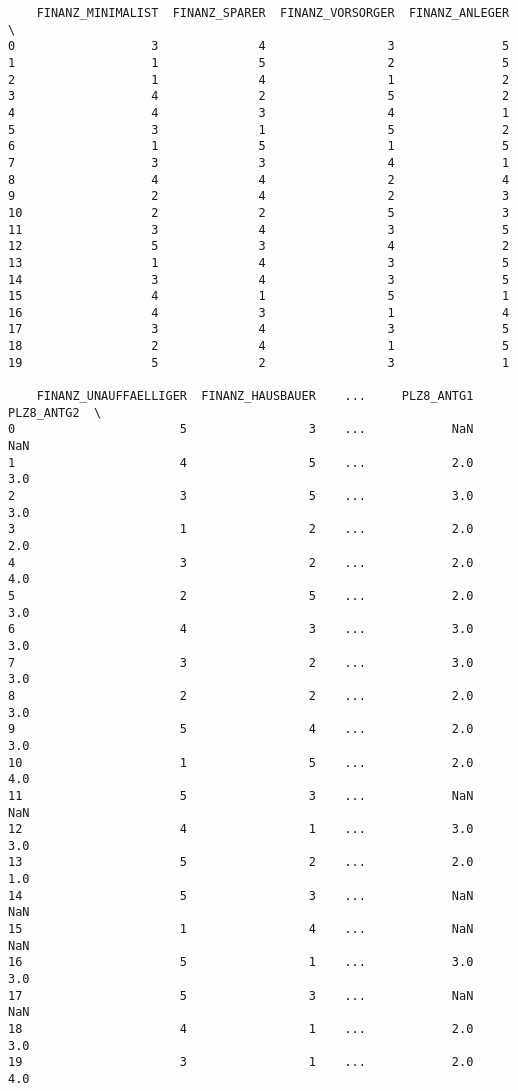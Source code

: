 \documentclass[11pt]{article}
\begin{document}
\begin{verbatim}
    FINANZ_MINIMALIST  FINANZ_SPARER  FINANZ_VORSORGER  FINANZ_ANLEGER  \
0                   3              4                 3               5   
1                   1              5                 2               5   
2                   1              4                 1               2   
3                   4              2                 5               2   
4                   4              3                 4               1   
5                   3              1                 5               2   
6                   1              5                 1               5   
7                   3              3                 4               1   
8                   4              4                 2               4   
9                   2              4                 2               3   
10                  2              2                 5               3   
11                  3              4                 3               5   
12                  5              3                 4               2   
13                  1              4                 3               5   
14                  3              4                 3               5   
15                  4              1                 5               1   
16                  4              3                 1               4   
17                  3              4                 3               5   
18                  2              4                 1               5   
19                  5              2                 3               1   

    FINANZ_UNAUFFAELLIGER  FINANZ_HAUSBAUER    ...     PLZ8_ANTG1  PLZ8_ANTG2  \
0                       5                 3    ...            NaN         NaN   
1                       4                 5    ...            2.0         3.0   
2                       3                 5    ...            3.0         3.0   
3                       1                 2    ...            2.0         2.0   
4                       3                 2    ...            2.0         4.0   
5                       2                 5    ...            2.0         3.0   
6                       4                 3    ...            3.0         3.0   
7                       3                 2    ...            3.0         3.0   
8                       2                 2    ...            2.0         3.0   
9                       5                 4    ...            2.0         3.0   
10                      1                 5    ...            2.0         4.0   
11                      5                 3    ...            NaN         NaN   
12                      4                 1    ...            3.0         3.0   
13                      5                 2    ...            2.0         1.0   
14                      5                 3    ...            NaN         NaN   
15                      1                 4    ...            NaN         NaN   
16                      5                 1    ...            3.0         3.0   
17                      5                 3    ...            NaN         NaN   
18                      4                 1    ...            2.0         3.0   
19                      3                 1    ...            2.0         4.0   


\end{verbatim}
\end{document}

